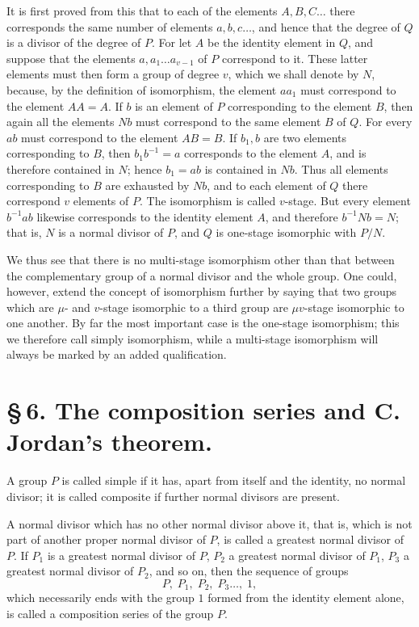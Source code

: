 \documentclass[11pt]{article}
\begin{document}
It is first proved from this that to each of the elements $A,B,C\ldots$ there corresponds the same number of elements $a,b,c\ldots$, and hence that the degree of $Q$ is a divisor of the degree of $P$. For let $A$ be the identity element in $Q$, and suppose that the elements $a,a_1\ldots a_{v-1}$ of $P$ correspond to it. These latter elements must then form a group of degree $v$, which we shall denote by $N$, because, by the definition of isomorphism, the element $aa_1$ must correspond to the element $AA=A$. If $b$ is an element of $P$ corresponding to the element $B$, then again all the elements $Nb$ must correspond to the same element $B$ of $Q$. For every $ab$ must correspond to the element $AB=B$. If $b_1,b$ are two elements corresponding to $B$, then $b_1b^{-1}=a$ corresponds to the element $A$, and is therefore contained in $N$; hence $b_1=ab$ is contained in $Nb$. Thus all elements corresponding to $B$ are exhausted by $Nb$, and to each element of $Q$ there correspond $v$ elements of $P$. The isomorphism is called $v$-stage. But every element $b^{-1}ab$ likewise corresponds to the identity element $A$, and therefore $b^{-1}Nb=N$; that is, $N$ is a normal divisor of $P$, and $Q$ is one-stage isomorphic with $P/N$.

We thus see that there is no multi-stage isomorphism other than that between the complementary group of a normal divisor and the whole group. One could, however, extend the concept of isomorphism further by saying that two groups which are $\mu$- and $v$-stage isomorphic to a third group are $\mu v$-stage isomorphic to one another. By far the most important case is the one-stage isomorphism; this we therefore call simply isomorphism, while a multi-stage isomorphism will always be marked by an added qualification.

\section*{\S\,6. The composition series and C. Jordan's theorem.}

A group $P$ is called simple if it has, apart from itself and the identity, no normal divisor; it is called composite if further normal divisors are present.

A normal divisor which has no other normal divisor above it, that is, which is not part of another proper normal divisor of $P$, is called a greatest normal divisor of $P$. If $P_1$ is a greatest normal divisor of $P$, $P_2$ a greatest normal divisor of $P_1$, $P_3$ a greatest normal divisor of $P_2$, and so on, then the sequence of groups
\begin{equation}
P,\;P_1,\;P_2,\;P_3\ldots,\;1,
\tag{1}
\end{equation}
which necessarily ends with the group $1$ formed from the identity element alone, is called a composition series of the group $P$.
\end{document}
